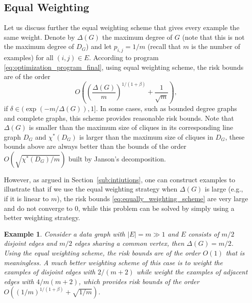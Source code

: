 \documentclass[letterpaper]{article} %
\newtheorem{example}{Example}
\newcommand{\pair}[1]{(#1)}
\newcommand{\fcoloring}{\chi^*}
\newcommand{\complexbound}{\beta}
\newcommand{\red}[1]{\textcolor{red}{#1}}
\newcommand{\todo}[1]{\red{\textsc{todo:} #1}}
\begin{document}
\subsection{Equal Weighting} %
\label{sub:equally_weighting}
Let us discuss further the equal weighting scheme that gives every example the same weight. Denote by $\Delta(G)$ the maximum degree of $G$ (note that this is not the maximum degree of $D_G$) and let $p_{i,j}=1/m$ (recall that $m$ is the number of examples) for all $\pair{i,j}\in E$. According to program \eqref{eq:optimization_program_final},
using equal weighting scheme, the risk bounds are of the order 
\begin{equation}
\label{eq:equally_weighting_scheme}
    O\left((\frac{\Delta(G)}{m})^{1/(1+\complexbound{})} + \frac{1}{\sqrt{m}}\right),
\end{equation}
if $\delta\in (\exp(-m/\Delta(G)),1]$. In some cases, such as bounded degree graphs and complete graphs, this scheme provides reasonable risk bounds.
Note that $\Delta(G)$ is smaller than the maximum size of cliques in its corresponding line graph $D_G$ and $\fcoloring{}(D_G)$ is larger than the maximum size of cliques in $D_G$, these bounds above are always better than the bounds of the order $O(\sqrt{\fcoloring{}(D_G)/m})$ built by Janson's decomposition. 

However, as argued in Section~\ref{sub:intiutions},
one can construct examples to illustrate that if we use the equal weighting strategy when $\Delta(G)$ is large (e.g., if it is linear to $m$), the risk bounds \eqref{eq:equally_weighting_scheme} are very large and do not converge to $0$, while this problem can be solved by simply using a better weighting strategy. 
\begin{example}
Consider a data graph with $|E|=m \gg 1$ and $E$ consists of $m/2$ disjoint edges and $m/2$ edges sharing a common vertex, then $\Delta(G)=m/2$. Using the equal weighting scheme, the risk bounds are of the order $O(1)$ that is meaningless. A much better weighting scheme of this case is to weight the examples of disjoint edges with $2/(m+2)$ while weight the examples of adjacent edges with $4/m(m+2)$, which provides risk bounds of the order $O\left((1/m)^{1/(1+\complexbound{})} + \sqrt{1/m}\right)$. %
\end{example}
\end{document}
